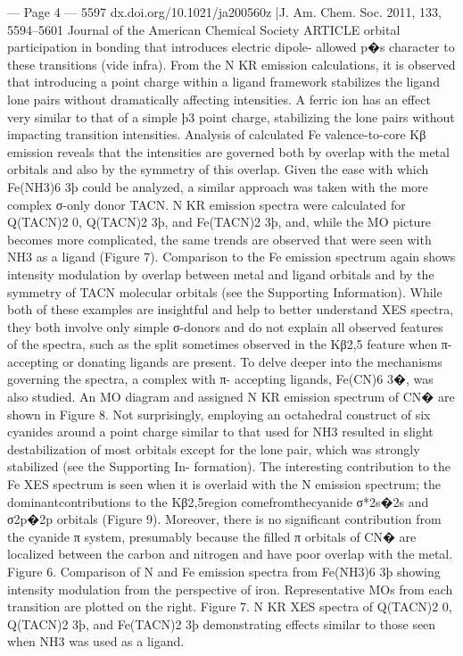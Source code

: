 --- Page 4 ---
5597
dx.doi.org/10.1021/ja200560z |J. Am. Chem. Soc. 2011, 133, 5594–5601
Journal of the American Chemical Society
ARTICLE
orbital participation in bonding that introduces electric dipole-
allowed p�s character to these transitions (vide infra).
From the N KR emission calculations, it is observed that
introducing a point charge within a ligand framework stabilizes
the ligand lone pairs without dramatically aﬀecting intensities.
A ferric ion has an eﬀect very similar to that of a simple þ3
point charge, stabilizing the lone pairs without impacting
transition intensities. Analysis of calculated Fe valence-to-core
Kβ emission reveals that the intensities are governed both by
overlap with the metal orbitals and also by the symmetry of
this overlap.
Given the ease with which Fe(NH3)6
3þ could be analyzed, a
similar approach was taken with the more complex σ-only donor
TACN. N KR emission spectra were calculated for Q(TACN)2
0,
Q(TACN)2
3þ, and Fe(TACN)2
3þ, and, while the MO picture
becomes more complicated, the same trends are observed that
were seen with NH3 as a ligand (Figure 7). Comparison to the Fe
emission spectrum again shows intensity modulation by overlap
between metal and ligand orbitals and by the symmetry of TACN
molecular orbitals (see the Supporting Information).
While both of these examples are insightful and help to
better understand XES spectra, they both involve only simple
σ-donors and do not explain all observed features of the spectra,
such as the split sometimes observed in the Kβ2,5 feature when π-
accepting or donating ligands are present. To delve deeper
into the mechanisms governing the spectra, a complex with π-
accepting ligands, Fe(CN)6
3�, was also studied. An MO diagram
and assigned N KR emission spectrum of CN� are shown in
Figure 8.
Not surprisingly, employing an octahedral construct of six
cyanides around a point charge similar to that used for NH3
resulted in slight destabilization of most orbitals except for the lone
pair, which was strongly stabilized (see the Supporting In-
formation). The interesting contribution to the Fe XES spectrum
is seen when it is overlaid with the N emission spectrum; the
dominantcontributions to the Kβ2,5region comefromthecyanide
σ*2s�2s and σ2p�2p orbitals (Figure 9). Moreover, there is no
signiﬁcant contribution from the cyanide π system, presumably
because the ﬁlled π orbitals of CN� are localized between
the carbon and nitrogen and have poor overlap with the metal.
Figure 6. Comparison of N and Fe emission spectra from Fe(NH3)6
3þ showing intensity modulation from the perspective of iron. Representative MOs
from each transition are plotted on the right.
Figure 7. N KR XES spectra of Q(TACN)2
0, Q(TACN)2
3þ, and
Fe(TACN)2
3þ demonstrating eﬀects similar to those seen when NH3
was used as a ligand.


